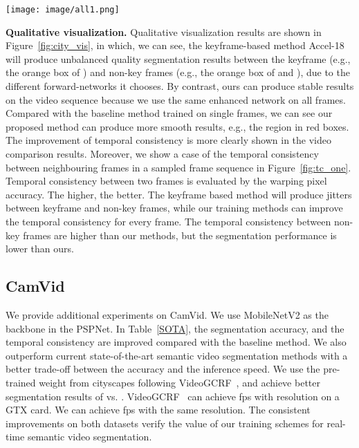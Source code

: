 \documentclass[runningheads]{llncs}
\begin{document}
\begin{figure*}[tbp]
    \centering
    \texttt{[image: image/all1.png]}
    \caption{\textbf{Qualitative outputs.}  (\textbf{a}): PSPNet18, training on multi frames and inferring on each frame. (\textbf{b}): PSPNet18, training and inferring on each frame. (\textbf{c}): Accel-18~\cite{jain2019accel}, training and inferring on multiple frames. The keyframe is selected in every five frames. For better visualization, we zoom the region in the red and orange box. The proposed method can give more consistent labels to the moving train and the trees in the red box. In the orange boxes, we can see our methods have similar quantity results in each frame while the keyframe based methods may generate worse results in the frame (e.g., ) which is far from the keyframe (i.e., ).}
    \label{fig:city_vis}
\end{figure*}
\noindent\textbf{Qualitative visualization.}
Qualitative visualization results are shown in Figure~\ref{fig:city_vis}, in which, we can see, the keyframe-based method Accel-18 will produce unbalanced quality segmentation results between the keyframe (e.g., the orange box of ) and non-key frames (e.g., the orange box of  and  ), due to the different forward-networks it chooses. By contrast, ours can produce stable results on the video sequence because we use the same enhanced network on all frames. Compared with the baseline method trained on single frames, we can see our proposed method can produce more smooth results, e.g., the region in red boxes. The improvement of temporal consistency is more clearly shown in the video comparison results.  Moreover, we show a case of the temporal consistency between neighbouring frames in a sampled frame sequence in Figure~\ref{fig:tc_one}. Temporal consistency between two frames is evaluated by the warping pixel accuracy. The higher, the better. The keyframe based method will produce jitters between keyframe and non-key frames, while our training methods can improve the temporal consistency for every frame. The temporal consistency between non-key frames are higher than our methods, but the segmentation performance is lower than ours.


\subsection{CamVid}
We provide additional experiments on CamVid.
We use MobileNetV2 as the backbone in the PSPNet.  In Table~\ref{SOTA}, the segmentation accuracy, and the temporal consistency are improved compared with the baseline method. We also outperform current state-of-the-art semantic video segmentation methods with a better trade-off between the accuracy and the inference speed. We use the pre-trained weight from cityscapes following VideoGCRF~\cite{chandra2018deep}, and achieve better segmentation results of  vs. . VideoGCRF~\cite{chandra2018deep} can achieve  fps with  resolution on a GTX  card.
We can achieve  fps with the same resolution.
The consistent improvements on both datasets
verify the value of
our training schemes for real-time semantic video segmentation.
\end{document}
